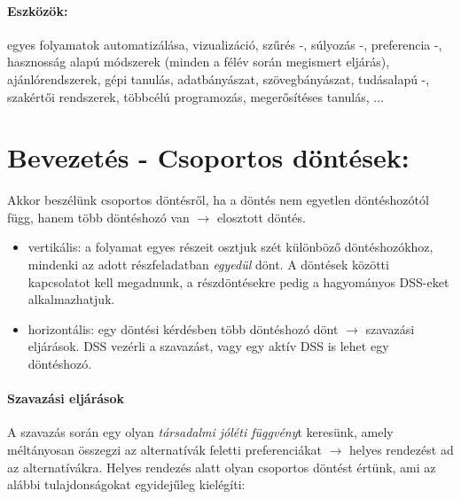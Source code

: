 \documentclass[a4paper,12pt]{article}
\begin{document}
\paragraph{Eszközök: } egyes folyamatok automatizálása, vizualizáció, szűrés -, súlyozás -, preferencia -, hasznosság alapú módszerek (minden a félév során megismert eljárás), ajánlórendszerek, gépi tanulás, adatbányászat, szövegbányászat, tudásalapú -, szakértői rendszerek, többcélú programozás, megerősítéses tanulás, ... 

\section{Bevezetés - Csoportos döntések:}

Akkor beszélünk csoportos döntésről, ha a döntés nem egyetlen döntéshozótól függ, hanem több döntéshozó van $\longrightarrow$ elosztott döntés.

\begin{itemize}
\item vertikális: a folyamat egyes részeit osztjuk szét különböző döntéshozókhoz, mindenki az adott részfeladatban \emph{egyedül} dönt. A döntések közötti kapcsolatot kell megadnunk, a részdöntésekre pedig a hagyományos DSS-eket alkalmazhatjuk.

\item horizontális: egy döntési kérdésben több döntéshozó dönt $\longrightarrow$ szavazási eljárások. DSS vezérli a szavazást, vagy egy aktív DSS is lehet egy döntéshozó. 
\end{itemize}

\paragraph{Szavazási eljárások}

A szavazás során egy olyan \emph{társadalmi jóléti függvény}t keresünk, amely méltányosan összegzi az alternatívák feletti preferenciákat $\longrightarrow$ helyes rendezést ad az alternatívákra. Helyes rendezés alatt olyan csoportos döntést értünk, ami az alábbi tulajdonságokat egyidejűleg kielégíti:
\end{document}
